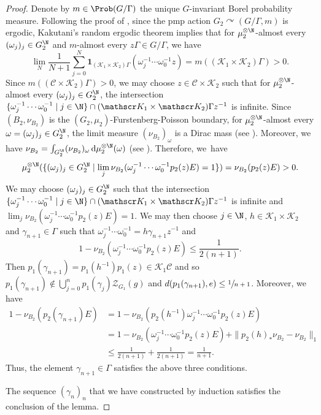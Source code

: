 \begin{proof}
Denote by $m \in \Prob(G/\Gamma)$ the unique $G$-invariant Borel probability measure. Following the proof of \cite[Lem.\,5.1]{Pe14}, since the pmp action $G_2 \curvearrowright (G/\Gamma, m)$ is ergodic, Kakutani's random ergodic theorem implies that for $\mu_2^{\otimes \N}$-almost every $(\omega_j)_j \in G_2^{\N}$ and $m$-almost every $z\Gamma \in G/\Gamma$, we have
\[
\lim_N \frac{1}{N + 1} \sum_{j = 0}^N \mathbf 1_{(\mathscr K_1 \times \mathscr K_2)\Gamma}(\omega_j^{-1} \cdots \omega_0^{-1} z) = m((\mathscr K_1 \times \mathscr K_2)\Gamma) > 0.
\]
Since $m((\mathscr C \times \mathscr K_2)\Gamma) > 0$, we may choose $z \in \mathscr C \times \mathscr K_2$ such that for $\mu_2^{\otimes \N}$-almost every $(\omega_j)_j \in G_2^{\N}$, the intersection $\{ \omega_j^{-1} \cdots \omega_0^{-1} \mid j \in \N \} \cap (\mathscr K_1 \times \mathscr K_2)\Gamma z^{-1}$ is infinite. Since $(B_2, \nu_{B_2})$ is the $(G_2, \mu_2)$-Furstenberg-Poisson boundary, for $\mu_2^{\otimes \N}$-almost every $\omega = (\omega_j)_j \in G_2^\N$, the limit measure $(\nu_{B_2})_\omega$ is a Dirac mass (see \cite[Th.\,2.14]{BS04}). Moreover, we have $\nu_{B_2} = \int_{G_2^\N} (\nu_{B_2})_\omega\, {\rm d}\mu_2^{\otimes \N}(\omega)$ (see \cite[Th.\,2.10]{BS04}). Therefore, we~have
\[
\mu_2^{\otimes \N} (\{(\omega_j)_j \in G_2^\N \mid \lim_j \nu_{B_2}(\omega_j^{-1} \cdots \omega_0^{-1} p_2(z) E) = 1\}) = \nu_{B_2}(p_2(z) E) > 0.
\]
We may choose $(\omega_j)_j \in G_2^{\N}$ such that the intersection $\{ \omega_j^{-1} \cdots \omega_0^{-1} \mid j \in \N \} \cap (\mathscr K_1 \times\nobreak \mathscr K_2)\Gamma z^{-1}$ is infinite and $\lim_j \nu_{B_2}(\omega_j^{-1} \cdots \omega_0^{-1} p_2(z) E) = 1$. We may then choose $j \in \N$, $h \in \mathscr K_1 \times \mathscr K_2$ and $\gamma_{n + 1} \in \Gamma$ such that $\omega_j^{-1} \cdots \omega_0^{-1} = h \gamma_{n + 1} z^{-1}$ and
\[
1 - \nu_{B_2}(\omega_j^{-1} \cdots \omega_0^{-1} p_2(z) E) \leq \frac{1}{2(n + 1)}.
\]
Then $p_1(\gamma_{n + 1}) = p_1(h^{-1})p_1(z) \in \mathscr K_1 \mathscr C$ and so $p_1(\gamma_{n + 1}) \notin \bigcup_{j = 0}^n p_1(\gamma_j)\mathscr Z_{G_1}(g)$ and $d(p_1(\gamma_{n + 1}), e) \leq \sfrac{1}{n + 1}$. Moreover, we have
\begin{align*}
1 - \nu_{B_2}(p_2(\gamma_{n + 1}) E) &= 1 - \nu_{B_2}(p_2(h^{-1}) \omega_j^{-1} \cdots \omega_0^{-1} p_2(z) E) \\
&= 1 - \nu_{B_2}(\omega_j^{-1} \cdots \omega_0^{-1} p_2(z) E) + \|p_2(h)_\ast \nu_{B_2} - \nu_{B_2}\|_1 \\
&\leq \frac{1}{2(n + 1)} + \frac{1}{2(n + 1)} = \frac{1}{n + 1}.
\end{align*}
Thus, the element $\gamma_{n + 1} \in \Gamma$ satisfies the above three conditions.

The sequence $(\gamma_n)_n$ that we have constructed by induction satisfies the conclusion of the lemma.
\end{proof}

